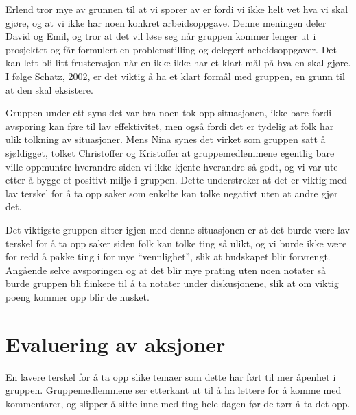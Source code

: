 Erlend tror mye av grunnen til at vi sporer av er fordi vi ikke helt vet hva vi skal gjøre, og at vi ikke har noen konkret 
arbeidsoppgave. Denne meningen deler David og Emil, og tror at det vil løse seg når gruppen kommer lenger ut i prosjektet og får 
formulert en problemstilling og delegert arbeidsoppgaver. Det kan lett bli litt frusterasjon når en ikke ikke har et klart mål på hva en 
skal gjøre. I følge Schatz, 2002, er det viktig å ha et klart formål med gruppen, en grunn til at den skal eksistere. \cite{Artikkel3}

Gruppen under ett syns det var bra noen tok opp situasjonen, ikke bare fordi avsporing kan føre til lav effektivitet, men også fordi det 
er tydelig at folk har ulik tolkning av situasjoner. Mens Nina synes det virket som gruppen satt å sjøldigget, tolket Christoffer og 
Kristoffer at gruppemedlemmene egentlig bare ville oppmuntre hverandre siden vi ikke kjente hverandre så godt, og vi var ute etter å 
bygge et positivt miljø i gruppen. Dette understreker at det er viktig med lav terskel for å ta opp saker som enkelte kan tolke negativt 
uten at andre gjør det.

Det viktigste gruppen sitter igjen med denne situasjonen er at det burde være lav terskel for å ta opp saker siden folk kan tolke ting så 
ulikt, og vi burde ikke være for redd å pakke ting i for mye ``vennlighet'', slik at budskapet blir forvrengt. Angående selve avsporingen 
og at det blir mye prating uten noen notater så burde gruppen bli flinkere til å ta notater under diskusjonene, slik at om viktig poeng 
kommer opp blir de husket.

\section{Evaluering av aksjoner}
En lavere terskel for å ta opp slike temaer som dette har ført til mer åpenhet i gruppen. Gruppemedlemmene ser etterkant ut til å ha lettere for å komme med kommentarer, og slipper å sitte inne med ting hele dagen før de tørr å ta det opp.


